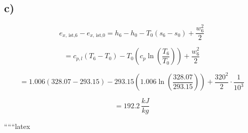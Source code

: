 

\subsection*{c)}

\[
e_{x, \, \text{ist,6}} - e_{x, \, \text{ist,0}} = h_6 - h_0 - T_0 (s_6 - s_0) + \frac{w_6^2}{2}
\]

\[
= c_{p,l} (T_6 - T_0) - T_0 \left( c_p \ln \left( \frac{T_6}{T_0} \right) \right) + \frac{w_6^2}{2}
\]

\[
= 1.006 \left( 328.07 - 293.15 \right) - 293.15 \left( 1.006 \ln \left( \frac{328.07}{293.15} \right) \right) + \frac{320^2}{2} \cdot \frac{1}{10^3}
\]

\[
= 192.2 \, \frac{kJ}{kg}
\]

``````latex